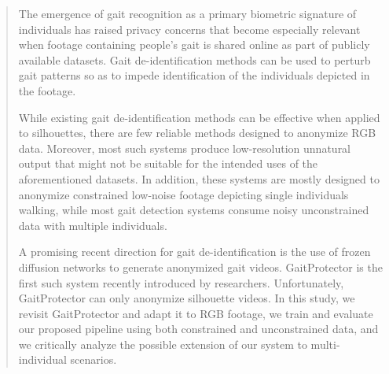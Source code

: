 \begin{abstract}
The emergence of gait recognition as a primary biometric signature of individuals has raised privacy concerns that become especially relevant when 
footage containing people's gait is shared online as part of publicly available datasets. Gait de-identification methods can be used to perturb gait patterns so as to
impede identification of the individuals depicted in the footage.

While existing gait de-identification methods can be effective when applied to silhouettes, there are few reliable methods designed to anonymize RGB data. Moreover, 
most such systems produce low-resolution unnatural output that might not be suitable for the intended uses of the aforementioned datasets. In addition, these systems
are mostly designed to anonymize constrained low-noise footage depicting single individuals walking, while most gait detection systems consume noisy unconstrained data with multiple individuals.

A promising recent direction for gait de-identification is the use of frozen diffusion networks to generate anonymized gait videos. GaitProtector is the first such
system recently introduced by researchers. Unfortunately, GaitProtector can only anonymize silhouette videos.
In this study, we revisit GaitProtector and adapt it to RGB footage, we train and evaluate our proposed pipeline using both constrained and unconstrained data,
and we critically analyze the possible extension of our system to multi-individual scenarios.
\end{abstract}

